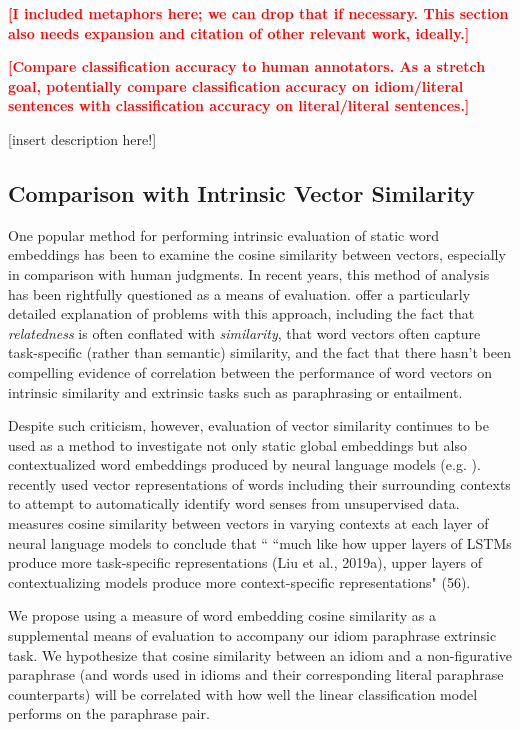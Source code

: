 \documentclass[11pt,a4paper]{article}
\newcommand{\comment}[1]{\textcolor{red}{\bf \small [#1]}}
\begin{document}
\comment{I included metaphors here; we can drop that if necessary. This section also needs expansion and citation of other relevant work, ideally.}

\comment{Compare classification accuracy to human annotators. As a stretch goal, potentially compare classification accuracy on idiom/literal sentences with classification accuracy on literal/literal sentences.}

\vspace{5mm}
[insert description here!]

\vspace{15mm}



\subsection{Comparison with Intrinsic Vector Similarity}

One popular method for performing intrinsic evaluation of static word embeddings has been to examine the cosine similarity between vectors, especially in comparison with human judgments. In recent years, this method of analysis has been rightfully questioned as a means of evaluation. \citet{faruqui-etal-2016-problems} offer a particularly detailed explanation of problems with this approach, including the fact that \textit{relatedness} is often conflated with \textit{similarity}, that word vectors often capture task-specific (rather than semantic) similarity, and the fact that there hasn't been compelling evidence of correlation between the performance of word vectors on intrinsic similarity and extrinsic tasks such as paraphrasing or entailment.

Despite such criticism, however, evaluation of vector similarity continues to be used as a method to investigate not only static global embeddings but also contextualized word embeddings produced by neural language models (e.g. \citet{van_Aken_2019}). \citet{huang_cho_bowman_2020} recently used vector representations of words including their surrounding contexts to attempt to automatically identify word senses from unsupervised data. \citep{ethayarajh2019contextual} measures cosine similarity between vectors in varying contexts at each layer of neural language models to conclude that `` ``much like how upper layers of LSTMs produce more task-specific
representations (Liu et al., 2019a), upper layers of contextualizing models produce more context-specific representations" (56).

 We propose using a measure of word embedding cosine similarity as a supplemental means of evaluation to accompany our idiom paraphrase extrinsic task. We hypothesize that cosine similarity between an idiom and a non-figurative paraphrase (and words used in idioms and their corresponding literal paraphrase counterparts) will be correlated with how well the linear classification model performs on the paraphrase pair.
 
\end{document}
